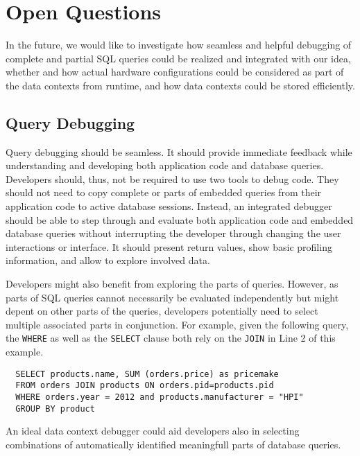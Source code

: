 \section{Open Questions} \label{sec:OPEN_QUESTIONS}
In the future, we would like to investigate how seamless and helpful debugging of complete and partial SQL queries could be realized and integrated with our idea, whether and how actual hardware configurations could be considered as part of the data contexts from runtime, and how data contexts could be stored efficiently.

\subsection{Query Debugging}
Query debugging should be seamless.
It should provide immediate feedback while understanding and developing both application code and database queries.
Developers should, thus, not be required to use two tools to debug code.
They should not need to copy complete or parts of embedded queries from their application code to active database sessions.
Instead, an integrated debugger should be able to step through and evaluate both application code and embedded database queries without interrupting the developer through changing the user interactions or interface.
It should present return values, show basic profiling information, and allow to explore involved data.

Developers might also benefit from exploring the parts of queries.
However, as parts of SQL queries cannot necessarily be evaluated independently but might depent on other parts of the queries, developers potentially need to select multiple associated parts in conjunction.
For example, given the following query, the \texttt{WHERE} as well as the \texttt{SELECT} clause both rely on the \texttt{JOIN} in Line 2 of this example.
\lstset{language=SQL}
\begin{lstlisting}
  SELECT products.name, SUM (orders.price) as pricemake
  FROM orders JOIN products ON orders.pid=products.pid
  WHERE orders.year = 2012 and products.manufacturer = "HPI"
  GROUP BY product
\end{lstlisting}
An ideal data context debugger could aid developers also in selecting combinations of automatically identified meaningfull parts of database queries.

